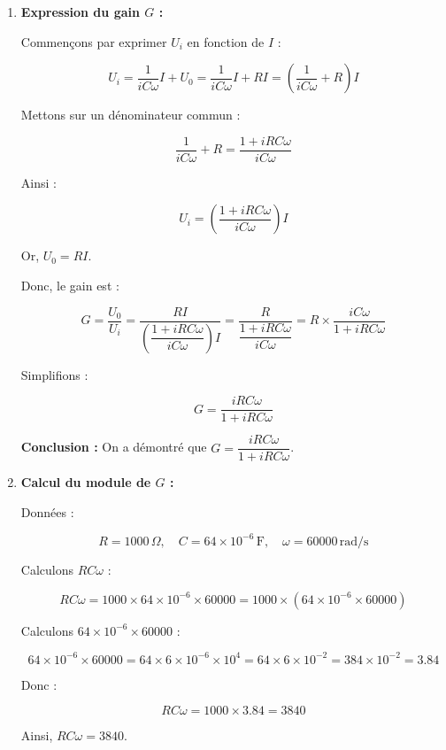 \documentclass[a4paper,12pt]{article}
\begin{document}
\begin{solutionbox}
\begin{enumerate}
    \item \textbf{Expression du gain \( G \) :}

    Commençons par exprimer \( U_i \) en fonction de \( I \) :

    \[
    U_i = \dfrac{1}{i C \omega} I + U_0 = \dfrac{1}{i C \omega} I + R I = \left( \dfrac{1}{i C \omega} + R \right) I
    \]

    Mettons sur un dénominateur commun :

    \[
    \dfrac{1}{i C \omega} + R = \dfrac{1 + i R C \omega}{i C \omega}
    \]

    Ainsi :

    \[
    U_i = \left( \dfrac{1 + i R C \omega}{i C \omega} \right) I
    \]

    Or, \( U_0 = R I \).

    Donc, le gain est :

    \[
    G = \dfrac{U_0}{U_i} = \dfrac{R I}{\left( \dfrac{1 + i R C \omega}{i C \omega} \right) I} = \dfrac{R}{\dfrac{1 + i R C \omega}{i C \omega}} = R \times \dfrac{i C \omega}{1 + i R C \omega}
    \]

    Simplifions :

    \[
    G = \dfrac{i R C \omega}{1 + i R C \omega}
    \]

    \textbf{Conclusion :} On a démontré que \( G = \dfrac{i R C \omega}{1 + i R C \omega} \).

    \item \textbf{Calcul du module de \( G \) :}

    Données :

    \[
    R = 1000 \, \Omega, \quad C = 64 \times 10^{-6} \, \text{F}, \quad \omega = 60000 \, \text{rad/s}
    \]

    Calculons \( R C \omega \) :

    \[
    R C \omega = 1000 \times 64 \times 10^{-6} \times 60000 = 1000 \times (64 \times 10^{-6} \times 60000)
    \]

    Calculons \( 64 \times 10^{-6} \times 60000 \) :

    \[
    64 \times 10^{-6} \times 60000 = 64 \times 6 \times 10^{-6} \times 10^{4} = 64 \times 6 \times 10^{-2} = 384 \times 10^{-2} = 3.84
    \]

    Donc :

    \[
    R C \omega = 1000 \times 3.84 = 3840
    \]

    Ainsi, \( R C \omega = 3840 \).


\end{enumerate}
\end{solutionbox}
\end{document}
